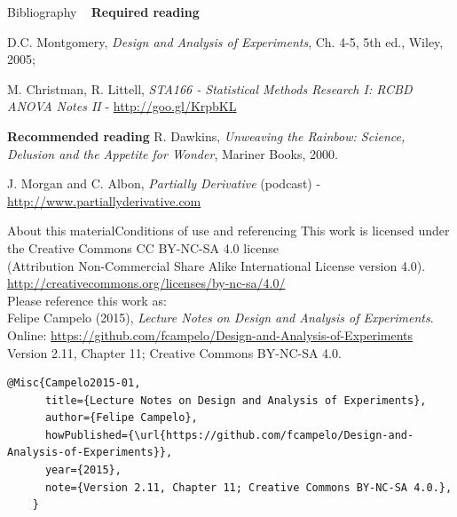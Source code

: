 \documentclass[t]{beamer}
\begin{document}

\begin{ftst}
{Bibliography}
{\ }
\scriptsize
\textbf{Required reading}

\benums D.C. Montgomery, \textit{Design and Analysis of Experiments}, Ch. 4-5, 5th ed., Wiley, 2005;
\item M. Christman, R. Littell, \textit{STA166 - Statistical Methods Research I: RCBD ANOVA Notes II} - \url{http://goo.gl/KrpbKL}
\eenum

\textbf{Recommended reading}
\benums R. Dawkins, \textit{Unweaving the Rainbow: Science, Delusion and the Appetite for Wonder}, Mariner Books, 2000.
\item J. Morgan and C. Albon, \textit{Partially Derivative} (podcast) - \url{http://www.partiallyderivative.com}
\eenum
\end{ftst}


\begin{ftstf}{About this material}{Conditions of use and referencing}
\centering\footnotesize This work is licensed under the Creative Commons CC BY-NC-SA 4.0 license\\(Attribution Non-Commercial Share Alike International License version 4.0).\\
\vhalf
\url{http://creativecommons.org/licenses/by-nc-sa/4.0/}\\
\vone
\footnotesize Please reference this work as:\\
\footnotesize \flushleft Felipe Campelo (2015), \textit{Lecture Notes on Design and Analysis of Experiments}.\\Online: {\scriptsize\url{https://github.com/fcampelo/Design-and-Analysis-of-Experiments}}\\
Version 2.11, Chapter 11; Creative Commons BY-NC-SA 4.0.\\

\begin{Verbatim}[fontsize=\tiny]
    @Misc{Campelo2015-01,
      title={Lecture Notes on Design and Analysis of Experiments},
      author={Felipe Campelo},
      howPublished={\url{https://github.com/fcampelo/Design-and-Analysis-of-Experiments}},
      year={2015},
      note={Version 2.11, Chapter 11; Creative Commons BY-NC-SA 4.0.},
    }
\end{Verbatim}

\end{ftstf}
\end{document}
